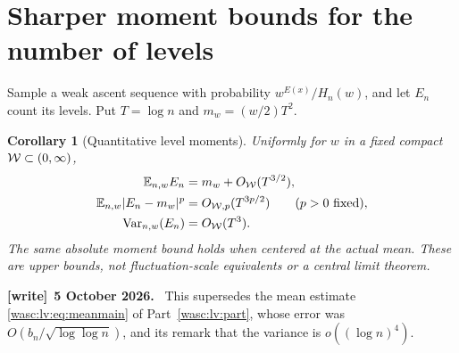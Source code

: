 \documentclass[11pt,a4paper]{article}
\newtheorem{corollary}[theorem]{Corollary}
\theoremstyle{remark}\newtheorem{remark}[theorem]{Remark}
\numberwithin{equation}{section}
\newenvironment{writenote}[1][]{\par\smallskip\begingroup\small
 \noindent\textbf{[write]}\if\relax\detokenize{#1}\relax\else~\textbf{#1.}\fi\ }%
 {\par\endgroup\smallskip}
\begin{document}
\section{Sharper moment bounds for the number of levels}\label{wasc:sh:sec:moments}
Sample a weak ascent sequence with probability $w^{E(x)}/H_n(w)$, and let $E_n$ count its levels. Put $T=\log n$ and $m_w=(w/2)T^2$.

\begin{corollary}[Quantitative level moments]\label{wasc:sh:cor:moments}
Uniformly for $w$ in a fixed compact $\mathcal W\subset(0,\infty)$,
\begin{align}
\mathbb E_{n,w}E_n&=m_w+O_{\mathcal W}(T^{3/2}),\label{wasc:sh:eq:mean}\\
\mathbb E_{n,w}|E_n-m_w|^p&=O_{\mathcal W,p}(T^{3p/2})\qquad(p>0\text{ fixed}),\label{wasc:sh:eq:moments}\\
\operatorname{Var}_{n,w}(E_n)&=O_{\mathcal W}(T^3).\label{wasc:sh:eq:variance}
\end{align}
The same absolute moment bound holds when centered at the actual mean. These are upper bounds, not fluctuation-scale equivalents or a central limit theorem.
\end{corollary}
\begin{writenote}[5 October 2026]
This supersedes the mean estimate \eqref{wasc:lv:eq:meanmain} of Part~\ref{wasc:lv:part}, whose error was $O(b_n/\sqrt{\log\log n})$, and its remark that the variance is $o((\log n)^4)$.
\end{writenote}
\end{document}
